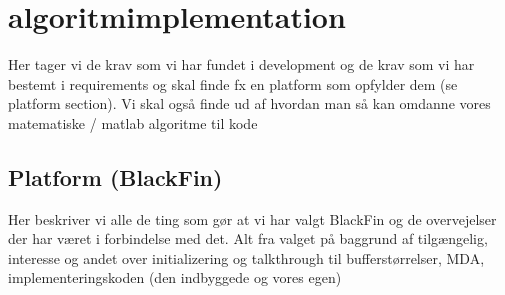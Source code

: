 \chapter{algoritmimplementation}
Her tager vi de krav som vi har fundet i development og de krav som vi har bestemt i requirements og skal finde fx en platform som opfylder dem (se platform section). Vi skal også finde ud af hvordan man så kan omdanne vores matematiske / matlab algoritme til kode
\section{Platform (BlackFin)}
Her beskriver vi alle de ting som gør at vi har valgt BlackFin og de overvejelser der har været i forbindelse med det. Alt fra valget på baggrund af tilgængelig, interesse og andet over initializering og talkthrough til bufferstørrelser, MDA, implementeringskoden (den indbyggede og vores egen)